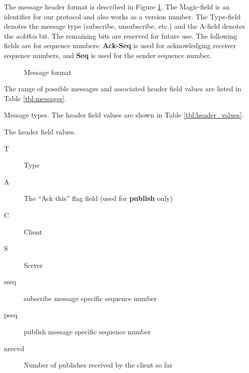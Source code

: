 \documentclass[a4paper]{article}
\begin{document}
The message header format is described in Figure \ref{fig:header}. The 
Magic-field is an identifier for our protocol and also works as a version
number. The Type-field denotes the message type (subscribe, unsubscribe, etc.)
and the A-field denotes the \textit{ackthis} bit. The remaining bits are reserved for future use. 
The following fields are for sequence numbers: \textbf{Ack-Seq} is used for acknowledging receiver 
sequence numbers, and \textbf{Seq} is used for the sender sequence number.

\begin{figure}
	\begin{center}
		
		\caption{Message format}
		\label{fig:header}
	\end{center}
\end{figure}

The range of possible messages and associated header field values are listed in Table 
\ref{tbl:messages}.

\begin{table}
\begin{center}
\caption{Message types. The header field values are shown in Table \ref{tbl:header_values}.}

\label{tbl:messages}
\end{center}
\end{table}

\begin{table}
\caption{The header field values.}
\begin{description}
  \item[T] Type
  \item[A] The ``Ack this'' flag field (used for \textbf{publish} only)
  \item[C] Client
  \item[S] Server
  \item[sseq] subscribe message specific sequence number
  \item[pseq] publish message specific sequence number
  \item[nrecvd] Number of publishes received by the client so far
\end{description}
\label{tbl:header_values}
\end{table}

\pagebreak
\end{document}
